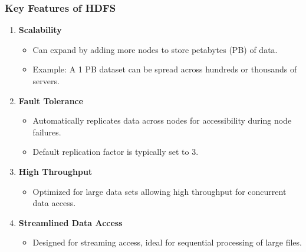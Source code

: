 \documentclass[aspectratio=169]{beamer}
\begin{document}
\begin{frame}[fragile]
    \frametitle{Key Features of HDFS}
    \begin{enumerate}
        \item \textbf{Scalability}
            \begin{itemize}
                \item Can expand by adding more nodes to store petabytes (PB) of data.
                \item Example: A 1 PB dataset can be spread across hundreds or thousands of servers.
            \end{itemize}
        \item \textbf{Fault Tolerance}
            \begin{itemize}
                \item Automatically replicates data across nodes for accessibility during node failures.
                \item Default replication factor is typically set to 3.
            \end{itemize}
        \item \textbf{High Throughput}
            \begin{itemize}
                \item Optimized for large data sets allowing high throughput for concurrent data access.
            \end{itemize}
        \item \textbf{Streamlined Data Access}
            \begin{itemize}
                \item Designed for streaming access, ideal for sequential processing of large files.
            \end{itemize}
    \end{enumerate}
\end{frame}
\end{document}
